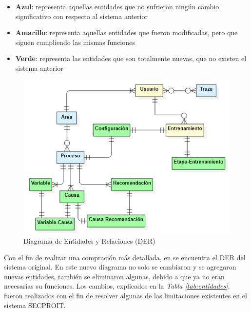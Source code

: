 \begin{itemize}
\item \textbf{Azul}: representa aquellas entidades que no sufrieron ningún cambio significativo con respecto al sistema anterior
\item \textbf{Amarillo}: representa aquellas entidades que fueron modificadas, pero que siguen cumpliendo las mismas funciones
\item \textbf{Verde}: representa las entidades que son totalmente nuevas, que no existen el sistema anterior
\end{itemize}

\begin{figure}[h]
\centering
 \includegraphics[width=0.6\linewidth]{imagen/der.png}
 \caption{Diagrama de Entidades y Relaciones (DER)}
 \label{fig:der} 
\end{figure}

Con el fin de realizar una compración más detallada, en \cite{ElenaAcostaGil2018} se encuentra el DER del sistema original. En este nuevo diagrama no solo se cambiaron y se agregaron nuevas entidades, también se eliminaron algunas, debido a que ya no eran necesarias su funciones. Los cambios, explicados en la \textsl{Tabla \ref{tab:entidades}}, fueron realizados con el fin de resolver algunas de las limitaciones existentes en el sistema SECPROIT.

